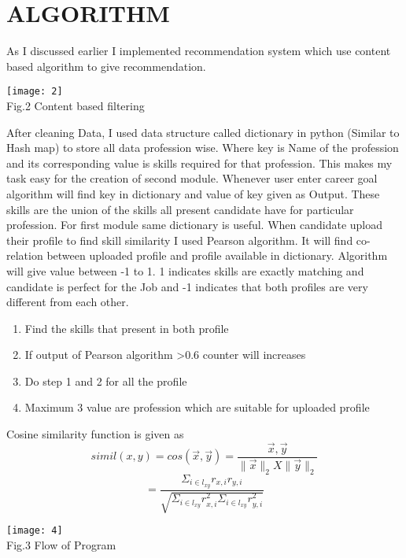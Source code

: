 \documentclass[journal, a4paper]{IEEEtran}
\begin{document}
\section{ALGORITHM}
As I discussed earlier I implemented recommendation system which use content based algorithm to give recommendation.	
\begin{center}
	\texttt{[image: 2]}\\
	\small Fig.2 Content based filtering
\end{center}
After cleaning Data, I used data structure called dictionary in python (Similar to Hash map) to store all data profession wise. Where key is Name of the profession and its corresponding value is skills required for that profession. This makes my task easy for the creation of second module. Whenever user enter career goal algorithm will find key in dictionary and value of key given as Output. These skills are the union of the skills all present candidate have for particular profession. For first module same dictionary is useful. When candidate upload their profile to find skill similarity I used Pearson algorithm. It will find co-relation between uploaded profile and profile available in dictionary. Algorithm will give value between -1 to 1. 1 indicates skills are exactly matching and candidate is perfect for the Job and -1 indicates that both profiles are very different from each other.
\begin{enumerate}
	\item Find the skills that present in both profile
	\item If output of Pearson algorithm \textgreater 0.6 counter will increases
	\item Do step 1 and 2 for all the profile
	\item Maximum 3 value are profession which are suitable for uploaded profile
\end{enumerate}
Cosine similarity function is given as\\
$$simil(x,y) = cos(\overrightarrow{x},\overrightarrow{y})=\frac{\overrightarrow{x},\overrightarrow{y}}{\parallel \overrightarrow{x} \parallel_2 X \parallel \overrightarrow{y} \parallel_2}$$
$$ = \frac{\Sigma_{i \in l_{xy}} r_{x,i} r_{y,i}}{\sqrt{\Sigma_{i \in l_{xy}} r_{x,i}^2 \Sigma_{i\in l_{xy}} r_{y,i}^2}}$$

	\begin{center}
		\texttt{[image: 4]}\\
		\small Fig.3 Flow of Program
	\end{center}
\end{document}
